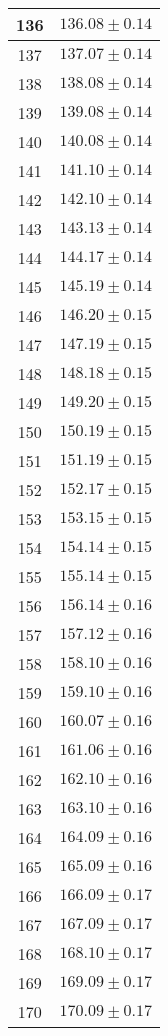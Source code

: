 \documentclass[prb,12pt]{revtex4-2}
\theoremstyle{definition}
\theoremstyle{definition}
\begin{document}
\begin{longtable}{cc}
	136 & $136.08\pm 0.14$ \\\midrule
	137 & $137.07\pm 0.14$ \\\midrule
	138 & $138.08\pm 0.14$ \\\midrule
	139 & $139.08\pm 0.14$ \\\midrule
	140 & $140.08\pm 0.14$ \\\midrule
	141 & $141.10\pm 0.14$ \\\midrule
	142 & $142.10\pm 0.14$ \\\midrule
	143 & $143.13\pm 0.14$ \\\midrule
	144 & $144.17\pm 0.14$ \\\midrule
	145 & $145.19\pm 0.14$ \\\midrule
	146 & $146.20\pm 0.15$ \\\midrule
	147 & $147.19\pm 0.15$ \\\midrule
	148 & $148.18\pm 0.15$ \\\midrule
	149 & $149.20\pm 0.15$ \\\midrule
	150 & $150.19\pm 0.15$ \\\midrule
	151 & $151.19\pm 0.15$ \\\midrule
	152 & $152.17\pm 0.15$ \\\midrule
	153 & $153.15\pm 0.15$ \\\midrule
	154 & $154.14\pm 0.15$ \\\midrule
	155 & $155.14\pm 0.15$ \\\midrule
	156 & $156.14\pm 0.16$ \\\midrule
	157 & $157.12\pm 0.16$ \\\midrule
	158 & $158.10\pm 0.16$ \\\midrule
	159 & $159.10\pm 0.16$ \\\midrule
	160 & $160.07\pm 0.16$ \\\midrule
	161 & $161.06\pm 0.16$ \\\midrule
	162 & $162.10\pm 0.16$ \\\midrule
	163 & $163.10\pm 0.16$ \\\midrule
	164 & $164.09\pm 0.16$ \\\midrule
	165 & $165.09\pm 0.16$ \\\midrule
	166 & $166.09\pm 0.17$ \\\midrule
	167 & $167.09\pm 0.17$ \\\midrule
	168 & $168.10\pm 0.17$ \\\midrule
	169 & $169.09\pm 0.17$ \\\midrule
	170 & $170.09\pm 0.17$ \\\midrule

\end{longtable}
\end{document}
